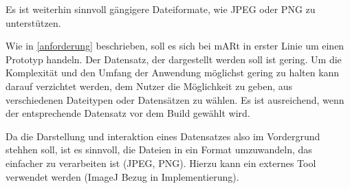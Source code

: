 Es ist weiterhin sinnvoll gängigere Dateiformate, wie JPEG oder PNG zu unterstützen. 

Wie in \ref{anforderung} beschrieben, soll es sich bei mARt in erster Linie um einen Prototyp handeln. 
Der Datensatz, der dargestellt werden soll ist gering. Um die Komplexität und den Umfang der Anwendung möglichst gering zu halten kann darauf verzichtet werden, dem Nutzer die Möglichkeit zu geben, aus verschiedenen Dateitypen oder Datensätzen zu wählen. Es ist ausreichend, wenn der entsprechende Datensatz vor dem Build gewählt wird.

Da die Darstellung und interaktion eines Datensatzes also im Vordergrund stehhen soll, ist es sinnvoll, die Dateien in ein Format umzuwandeln, das einfacher zu verarbeiten ist (JPEG, PNG). Hierzu kann ein externes Tool verwendet werden (ImageJ Bezug in Implementierung).
